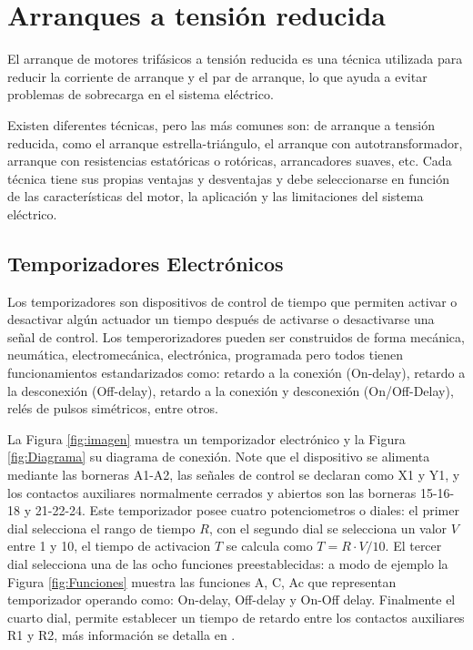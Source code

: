 \section{Arranques a tensión reducida}
El arranque de motores trifásicos a tensión reducida es una técnica utilizada para reducir la corriente de arranque y el par de arranque, lo que ayuda a evitar problemas de sobrecarga en el sistema eléctrico.

Existen diferentes técnicas, pero las más comunes son: de arranque a tensión reducida, como el arranque estrella-triángulo, el arranque con autotransformador, arranque con resistencias estatóricas o rotóricas, arrancadores suaves, etc. Cada técnica tiene sus propias ventajas y desventajas y debe seleccionarse en función de las características del motor, la aplicación y las limitaciones del sistema eléctrico.

\subsection{Temporizadores Electrónicos}

Los temporizadores son dispositivos de control de tiempo que permiten activar o desactivar algún actuador un tiempo después de activarse o desactivarse una señal de control. Los temperorizadores pueden ser  construidos de forma mecánica, neumática, electromecánica, electrónica, programada pero todos tienen funcionamientos estandarizados como: retardo a la conexión (On-delay), retardo a la desconexión (Off-delay), retardo a la conexión y desconexión (On/Off-Delay), relés de pulsos simétricos, entre otros. 

La Figura \ref{fig:imagen} muestra un temporizador electrónico y la Figura \ref{fig:Diagrama} su diagrama de conexión. Note que el dispositivo se alimenta mediante las borneras A1-A2,  las señales de control se declaran como X1 y Y1, y los contactos auxiliares normalmente cerrados y abiertos son las borneras 15-16-18 y 21-22-24. Este temporizador posee cuatro potenciometros o diales: el  primer dial selecciona el rango de tiempo $R$, con el segundo dial se selecciona un valor $V$ entre 1 y 10, el tiempo de activacion  $T$ se calcula como  $T=R\cdot V/10$. El tercer dial selecciona una de las ocho funciones preestablecidas: a modo de ejemplo la Figura \ref{fig:Funciones} muestra las funciones A, C, Ac que representan temporizador operando como: On-delay, Off-delay y On-Off delay. Finalmente el cuarto dial, permite establecer un tiempo de retardo entre los contactos auxiliares R1 y R2, más información se detalla en \cite{Scheneider4}.


